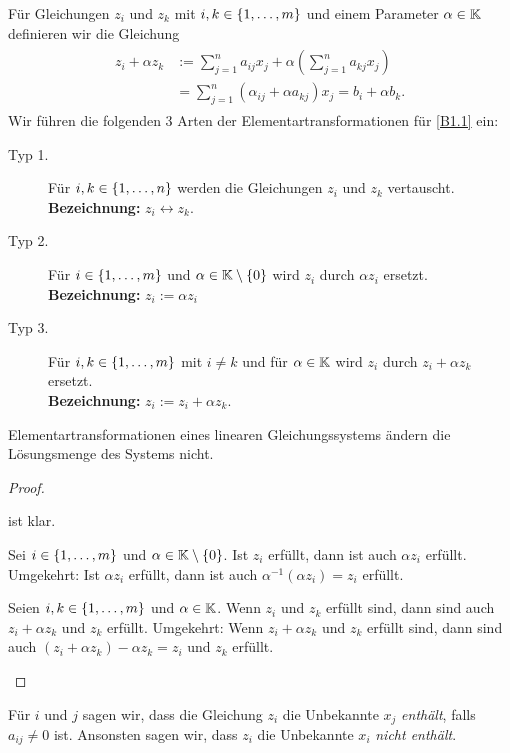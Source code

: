 \begin{appendices}
Für Gleichungen $ z_i $ und $ z_k $ mit $ i,k \in \{ 1,\ldots,m \} $ und einem Parameter $ \alpha \in \mathbb K $ definieren wir die Gleichung
\begin{align}
\begin{split}
	z_i + \alpha z_k &:= \sum_{j=1}^{n} a_{ij} x_j + \alpha \left( \sum_{j=1}^{n} a_{kj}x_j \right) \\
	&= \sum_{j=1}^{n}\left( \alpha_{ij} + \alpha a_{kj} \right)x_j = b_i + \alpha b_k.
\end{split}
\end{align}
Wir führen die folgenden 3 Arten der Elementartransformationen für \eqref{B1.1} ein:
\begin{description}
	\item[Typ 1.]
		Für $ i,k \in \{ 1,\ldots,n \} $ werden die Gleichungen $ z_i $ und $ z_k $ vertauscht.
		\\ \textbf{Bezeichnung:} $ z_i \leftrightarrow z_k $.
	\item[Typ 2.]
		Für $ i \in \{ 1,\ldots,m \} $ und $ \alpha \in \mathbb K\setminus\{0\} $ wird $ z_i $ durch $ \alpha z_i $ ersetzt. \\ 
		\textbf{Bezeichnung:} $ z_i := \alpha z_i $ 
	\item[Typ 3.]
		Für $ i,k \in \{ 1,\ldots,m \} $ mit $ i \neq k $ und für $ \alpha \in \mathbb K $ wird $ z_i $ durch $ z_i + \alpha z_k $ ersetzt. \\ 
		\textbf{Bezeichnung:} $ z_i :=  z_i + \alpha z_k $.
\end{description}

\begin{propn}
	Elementartransformationen eines linearen Gleichungssystems ändern die Lösungsmenge des Systems nicht.
\end{propn}
\begin{proof} \ 
	\begin{description}[font=\normalfont]
		\item[Typ 1]
			ist klar.
		\item[Typ 2:]
			Sei $ i \in \{ 1,\ldots,m \} $ und $ \alpha \in \mathbb K\setminus\{0\} $.
			Ist $ z_i $ erfüllt, dann ist auch $ \alpha z_i $ erfüllt. Umgekehrt: Ist $ \alpha z_i $ erfüllt, dann ist auch $ \alpha^{-1}\left( \alpha z_i \right) = z_i $ erfüllt.
		\item[Typ 3:]
			Seien $ i,k \in \{ 1,\ldots,m \} $ und $ \alpha \in \mathbb K $. Wenn $ z_i $ und $ z_k $ erfüllt sind, dann sind auch $ z_i + \alpha z_k $ und $ z_k $ erfüllt. Umgekehrt: Wenn $ z_i + \alpha z_k $ und $ z_k $ erfüllt sind, dann sind auch $ (z_i + \alpha z_k ) - \alpha z_k = z_i $ und $ z_k $ erfüllt.\qedhere
	\end{description}
\end{proof}
Für $ i $ und $ j $ sagen wir, dass die Gleichung $ z_i $ die Unbekannte $ x_j $ \textit{enthält}, falls $ a_{ij} \neq 0 $ ist. Ansonsten sagen wir, dass $ z_i $ die Unbekannte $ x_i $ \emph{nicht enthält}.



\end{appendices}
